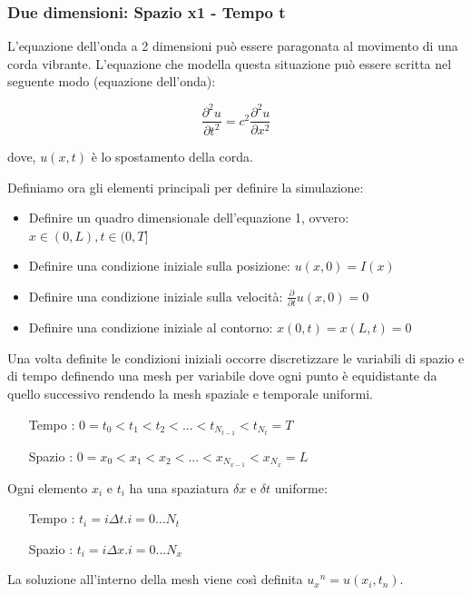 \documentclass{article}
\begin{document}
\subsubsection{Due dimensioni: Spazio x1 - Tempo t}
L'equazione dell'onda a 2 dimensioni può essere paragonata al movimento di una corda vibrante.
L'equazione che modella questa situazione può essere scritta nel seguente modo (equazione dell'onda):

\begin{equation}
	\frac{\partial^2u}{\partial t^2} = c^2\frac{\partial^2u}{\partial x^2}
\end{equation}

dove, $u(x, t)$ è lo spostamento della corda.

Definiamo ora gli elementi principali per definire la simulazione:

\begin{itemize}
\item Definire un quadro dimensionale dell'equazione 1, ovvero: $x \in (0,L), t \in (0, T] $
\item Definire una condizione iniziale sulla posizione: $u(x, 0) = I(x) $
\item Definire una condizione iniziale sulla velocità: $\frac{\partial}{\partial t}u(x, 0) = 0 $
\item Definire una condizione iniziale al contorno: $x(0, t) = x(L, t) = 0 $
\end{itemize}

Una volta definite le condizioni iniziali occorre discretizzare le variabili di spazio e di tempo definendo una mesh per variabile dove ogni punto è equidistante da quello successivo rendendo la mesh spaziale e temporale uniformi.

\begin{itemize}
\item[Tempo] : $0=t_0<t_1<t_2<...<t_{N_{t-1}}<t_{N_t}=T$
\item[Spazio] : $0=x_0<x_1<x_2<...<x_{N_{x-1}}<x_{N_x}=L$
\end{itemize}

Ogni elemento $x_i$ e $t_i$ ha una spaziatura $\delta x$ e $\delta t$ uniforme:

\begin{itemize}
\item[Tempo] : $t_i=i\Delta t. i=0...N_t$
\item[Spazio] : $t_i=i\Delta x. i=0...N_x$
\end{itemize}

La soluzione all'interno della mesh viene così definita $u{_x}{^n}=u(x_i,t_n)$.
\end{document}
